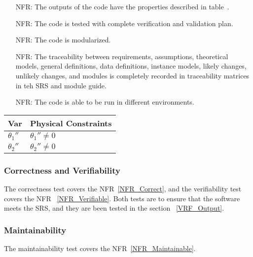 \documentclass[12pt, titlepage]{article}
\newcounter{reqnum} %
\begin{document}
\noindent \begin{itemize}

\item[NFR\refstepcounter{reqnum}\thereqnum \label{NFR_Correct}:] 
The outputs of the code have the properties described in table~.
\item[NFR\refstepcounter{reqnum}\thereqnum \label{NFR_Verifiable}:]  
The code is tested with complete verification and validation plan.
\item[NFR\refstepcounter{reqnum}\thereqnum \label{NFR_Reusable}:]
The code is modularized. 
\item[NFR\refstepcounter{reqnum}\thereqnum \label{NFR_Maintainable}:]
The traceability between requirements, assumptions, theoretical models, general definitions, data definitions, instance models, likely changes, unlikely changes, and modules is completely recorded in traceability matrices in teh SRS and module guide. 
\item[NFR\refstepcounter{reqnum}\thereqnum \label{NFR_Portable}:]
The code is able to be run in different environments. 
\end{itemize}

\begin{table}[H]
\caption{Output Variables} \label{TblOutputVar}
\renewcommand{\arraystretch}{1.2}
\noindent \begin{longtable*}{l l} 
  \toprule
  \textbf{Var} & \textbf{Physical Constraints} \\
  \midrule 
  ${\theta_1}''$ & ${\theta_1}'' \neq 0$\\
  ${\theta_2}''$ & ${\theta_2}'' \neq 0$\\
  \bottomrule
\end{longtable*}
\end{table}


\subsubsection{Correctness and Verifiability}\label{CnV}
		
The correctness test covers the NFR~\ref{NFR_Correct}, and the verifiability test covers the NFR ~\ref{NFR_Verifiable}. Both tests are to ensure that the software meets the SRS, and they are been tested in the section ~\ref{VRF_Output}.

\subsubsection{Maintainability}\label{MainTest}
The maintainability test covers the NFR~\ref{NFR_Maintainable}. 
\end{document}
